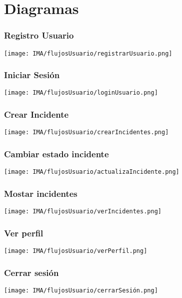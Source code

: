 \section{Diagramas}

\subsubsection*{Registro Usuario}
\begin{center}
    \texttt{[image: IMA/flujosUsuario/registrarUsuario.png]}
\end{center}

\newpage
\subsubsection*{Iniciar Sesión}
\begin{center}
    \texttt{[image: IMA/flujosUsuario/loginUsuario.png]}
\end{center}

\newpage
\subsubsection*{Crear Incidente}
\begin{center}
    \texttt{[image: IMA/flujosUsuario/crearIncidentes.png]}
\end{center}

\newpage
\subsubsection*{Cambiar estado incidente}
\begin{center}
    \texttt{[image: IMA/flujosUsuario/actualizaIncidente.png]}
\end{center}

\newpage
\subsubsection*{Mostar incidentes}
\begin{center}
    \texttt{[image: IMA/flujosUsuario/verIncidentes.png]}
\end{center}

\newpage
\subsubsection*{Ver perfil}
\begin{center}
    \texttt{[image: IMA/flujosUsuario/verPerfil.png]}
\end{center}

\newpage
\subsubsection*{Cerrar sesión}
\begin{center}
    \texttt{[image: IMA/flujosUsuario/cerrarSesión.png]}
\end{center}